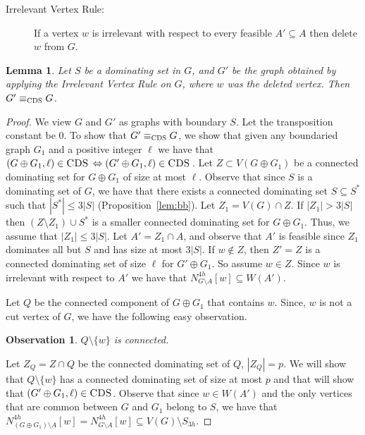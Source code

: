 \documentclass[11pt]{article}
\newtheorem{observation}{Observation}
\newtheorem{lemma}{Lemma}
\newcommand{\tCDS}{{\texttt{\sc CDS}}}
\begin{document}
\begin{description}
\item[Irrelevant Vertex Rule:] If a vertex $w$ is irrelevant with respect to every feasible $A' \subseteq A$ then delete $w$ from $G$. 
\end{description}


 \begin{lemma}
 \label{lem:condomseteqiv1}
Let $S$ be a dominating set in $G$, and $G'$ be the graph obtained by applying the Irrelevant Vertex Rule on $G$, where $w$ was the deleted vertex.  Then $G' \equiv_{\tCDS} G$. 
\end{lemma}
 \begin{proof}
 We view $G$ and $G'$ as graphs with boundary $S$. Let the transposition constant be $0$. To show that $G' \equiv_{\tCDS} G$, we show that given any boundaried graph $G_1$ and a positive 
 integer $\ell$ we have that $(G\oplus G_1,\ell)\in \tCDS\, \Leftrightarrow (G'\oplus G_1,\ell)\in \tCDS\,$.  Let $Z \subset V(G\oplus G_1)$  be a connected dominating set for $G\oplus G_1$ of size at most $\ell$.  Observe that since $S$ is a dominating set of $G$, we have that there exists a connected dominating set $S\subseteq S^*$  such that $|S^*|\leq 3|S|$ (Proposition~\ref{lem:bb}). Let $Z_1=V(G)\cap Z$. If $|Z_1|>3|S|$ then 
  $(Z\setminus Z_1)\cup S^*$ is a smaller connected dominating set for $G\oplus G_1$. Thus, we assume that 
  $|Z_1|\leq 3|S|$.  Let $A' = Z_1 \cap A$, and observe that $A'$ is feasible since $Z_1$ dominates all but $S$ and has size at  most $3|S|$. If $w \notin Z$, then $Z'=Z$ is a connected dominating set of size $\ell$ for $G'\oplus G_1$.  So assume $w\in Z$. Since $w$ is irrelevant with respect to $A'$ we have that $N_{G\setminus A}^{4h}[w] \subseteq W(A')$. 

  



Let $Q$ be the connected component of $G\oplus G_1$ that contains $w$.  Since, $w$ is not a cut vertex of $G$, we have the following easy observation. 

\begin{observation}
\label{claim:wisokay}
$Q\setminus \{w\}$ is connected. 
\end{observation}


Let $Z_Q=Z \cap Q$ be the connected dominating set of $Q$, $|Z_Q|=p$. 
We will show that $Q\setminus \{w\}$ has a connected dominating set of size at most $p$ and that will show that 
$(G'\oplus G_1,\ell)\in \tCDS$.   Observe that since $w\in W(A')$ and the only vertices that are common between $G$ and $G_1$ belong to $S$, we have that 
$N_{(G\oplus G_1)\setminus A}^{4h}[w]=N_{G\setminus A}^{4h}[w]\subseteq V(G)\setminus S_{3h}$. 


\end{proof}
\end{document}
